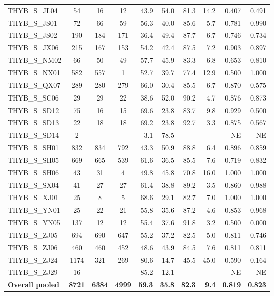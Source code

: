 \begin{responsetable}
\begin{adjustbox}{max width=\textwidth,center}
\begin{tabular}{@{}l *{3}{c} *{6}{r} @{}}
THYB\_S\_JL04 & 54 & 16 & 12 & 43.9 & 54.0 & 81.3 & 14.2 & 0.407 & 0.491 \\
THYB\_S\_JS01 & 72 & 66 & 59 & 56.3 & 40.0 & 85.6 & 5.7 & 0.781 & 0.990 \\
THYB\_S\_JS02 & 190 & 184 & 171 & 36.4 & 49.4 & 87.7 & 6.7 & 0.746 & 0.734 \\
THYB\_S\_JX06 & 215 & 167 & 153 & 54.2 & 42.4 & 87.5 & 7.2 & 0.903 & 0.897 \\
THYB\_S\_NM02 & 66 & 50 & 49 & 57.7 & 45.9 & 83.3 & 6.8 & 0.653 & 0.810 \\
THYB\_S\_NX01 & 582 & 557 & 1 & 52.7 & 39.7 & 77.4 & 12.9 & 0.500 & 1.000 \\
THYB\_S\_QX07 & 289 & 280 & 279 & 66.0 & 30.4 & 85.5 & 6.7 & 0.870 & 0.575 \\
THYB\_S\_SC06 & 29 & 29 & 22 & 38.6 & 52.0 & 90.2 & 4.7 & 0.876 & 0.873 \\
THYB\_S\_SD12 & 75 & 16 & 15 & 69.6 & 23.8 & 83.7 & 9.8 & 0.929 & 0.500 \\
THYB\_S\_SD13 & 22 & 18 & 18 & 69.2 & 23.8 & 92.7 & 3.3 & 0.875 & 0.567 \\
THYB\_S\_SD14 & 2 & --- & --- & 3.1 & 78.5 & --- & --- & NE & NE \\
THYB\_S\_SH01 & 832 & 834 & 792 & 43.3 & 50.9 & 88.8 & 6.4 & 0.896 & 0.859 \\
THYB\_S\_SH05 & 669 & 665 & 539 & 61.6 & 36.5 & 85.5 & 7.6 & 0.719 & 0.832 \\
THYB\_S\_SH06 & 43 & 31 & 4 & 49.8 & 45.8 & 70.8 & 16.0 & 1.000 & 1.000 \\
THYB\_S\_SX04 & 41 & 27 & 27 & 61.4 & 38.8 & 89.2 & 3.5 & 0.860 & 0.988 \\
THYB\_S\_XJ01 & 25 & 8 & 5 & 68.6 & 29.1 & 82.7 & 7.0 & 1.000 & 1.000 \\
THYB\_S\_YN01 & 25 & 22 & 21 & 55.8 & 35.6 & 87.2 & 4.6 & 0.853 & 0.968 \\
THYB\_S\_YN05 & 137 & 12 & 12 & 55.4 & 37.6 & 91.8 & 3.2 & 0.500 & 0.000 \\
THYB\_S\_ZJ05 & 694 & 690 & 647 & 55.2 & 37.2 & 82.5 & 5.0 & 0.811 & 0.746 \\
THYB\_S\_ZJ06 & 460 & 460 & 452 & 48.6 & 43.9 & 84.5 & 7.6 & 0.811 & 0.811 \\
THYB\_S\_ZJ24 & 1174 & 321 & 269 & 80.6 & 14.7 & 45.5 & 45.0 & 0.590 & 0.164 \\
THYB\_S\_ZJ29 & 16 & --- & --- & 85.2 & 12.1 & --- & --- & NE & NE \\
\textbf{Overall pooled} & \textbf{8721} & \textbf{6384} & \textbf{4999} & \textbf{59.3} & \textbf{35.8} & \textbf{82.3} & \textbf{9.4} & \textbf{0.819} & \textbf{0.823} \\

\end{tabular}
\end{adjustbox}
\end{responsetable}

